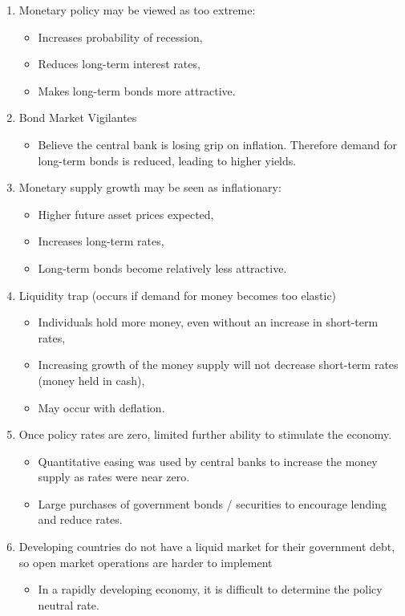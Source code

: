 \documentclass[../notes_compiled.tex]{subfiles}
\begin{document}
\begin{itemize}
\begin{enumerate}
\item Monetary policy may be viewed as too extreme:
\begin{itemize}
\item Increases probability of recession,
\item Reduces long-term interest rates,
\item Makes long-term bonds more attractive.
\end{itemize}
\item Bond Market Vigilantes
\begin{itemize}
\item Believe the central bank is losing grip on inflation. Therefore demand for long-term bonds is reduced, leading to higher yields.
\end{itemize}
\item Monetary supply growth may be seen as inflationary:
\begin{itemize}
\item Higher future asset prices expected,
\item Increases long-term rates,
\item Long-term bonds become relatively less attractive.
\end{itemize}
\item Liquidity trap (occurs if demand for money becomes too elastic)
\begin{itemize}
\item Individuals hold more money, even without an increase in short-term rates,
\item Increasing growth of the money supply will not decrease short-term rates (money held in cash),
\item May occur with deflation.
\end{itemize}
\item Once policy rates are zero, limited further ability to stimulate the economy.
\begin{itemize}
\item Quantitative easing was used by central banks to increase the money supply as rates were near zero.
\item Large purchases of government bonds / securities to encourage lending and reduce rates.
\end{itemize}
\item Developing countries do not have a liquid market for their government debt, so open market operations are harder to implement
\begin{itemize}
\item In a rapidly developing economy, it is difficult to determine the policy neutral rate.

\end{itemize}
\end{enumerate}
\end{itemize}
\end{document}
